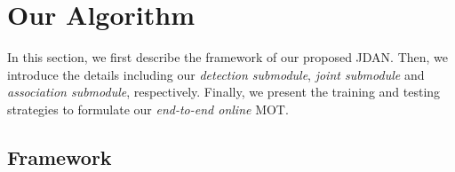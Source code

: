 \documentclass[acmsmall]{acmart}
\begin{document}
\section{Our Algorithm}
{
In this section, we first describe the framework of our proposed JDAN.
Then, we introduce the details including our \emph{detection submodule}, \emph{joint submodule} and \emph{association submodule}, respectively.
Finally, we present the training and testing strategies to formulate our \emph{end-to-end online} MOT.
}


\subsection{Framework}
\end{document}
